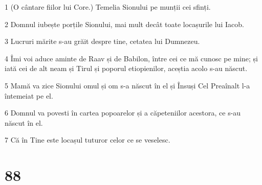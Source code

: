 \par 1 (O cântare fiilor lui Core.) Temelia Sionului pe munții cei sfinți.
\par 2 Domnul iubește porțile Sionului, mai mult decât toate locașurile lui Iacob.
\par 3 Lucruri mărite s-au grăit despre tine, cetatea lui Dumnezeu.
\par 4 Îmi voi aduce aminte de Raav și de Babilon, între cei ce mă cunosc pe mine; și iată cei de alt neam și Tirul și poporul etiopienilor, aceștia acolo s-au născut.
\par 5 Mamă va zice Sionului omul și om s-a născut în el și Însuși Cel Preaînalt l-a întemeiat pe el.
\par 6 Domnul va povesti în cartea popoarelor și a căpeteniilor acestora, ce s-au născut în el.
\par 7 Că în Tine este locașul tuturor celor ce se veselesc.

\chapter{88}

